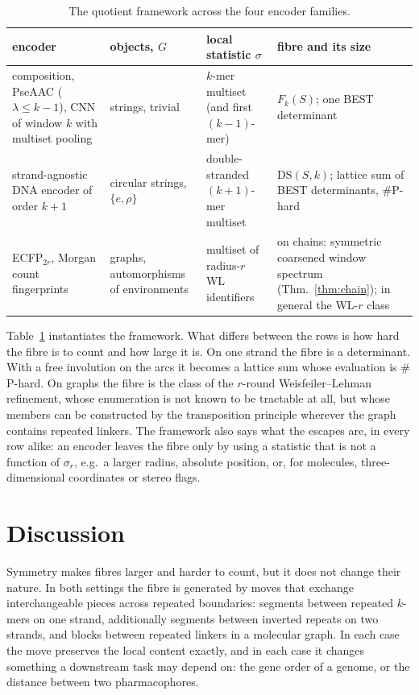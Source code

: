 \documentclass[11pt]{article}
\theoremstyle{plain}
\theoremstyle{definition}
\theoremstyle{remark}
\newcommand{\DS}{\mathrm{DS}}
\begin{document}
\begin{table}[t]
\centering\small
\renewcommand{\arraystretch}{1.15}
\begin{tabular}{>{\raggedright\arraybackslash}p{}>{\raggedright\arraybackslash}p{}>{\raggedright\arraybackslash}p{}>{\raggedright\arraybackslash}p{}}
\toprule
encoder & objects, $G$ & local statistic $\sigma$ & fibre and its size\\
\midrule
composition, PseAAC ($\lambda\le k-1$), CNN of window $k$ with multiset pooling & strings, trivial & $k$-mer multiset (and first $(k-1)$-mer) & $F_k(S)$; one BEST determinant \cite{CC26a}\\
strand-agnostic DNA encoder of order $k+1$ & circular strings, $\{e,\rho\}$ & double-stranded $(k+1)$-mer multiset & $\DS(S,k)$; lattice sum of BEST determinants, $\#$P-hard \cite{AG}\\
ECFP$_{2r}$, Morgan count fingerprints & graphs, automorphisms of environments & multiset of radius-$r$ WL identifiers & on chains: symmetric coarsened window spectrum (Thm.~\ref{thm:chain}); in general the WL-$r$ class\\
\bottomrule
\end{tabular}
\caption{The quotient framework across the four encoder families.}\label{tab:unified}
\end{table}

Table~\ref{tab:unified} instantiates the framework. What differs between the rows is how hard the fibre is to
count and how large it is. On one strand the fibre is a determinant. With a free involution on the arcs it
becomes a lattice sum whose evaluation is $\#$P-hard. On graphs the fibre is the class of the $r$-round
Weisfeiler--Lehman refinement, whose enumeration is not known to be tractable at all, but whose members can be
constructed by the transposition principle wherever the graph contains repeated linkers. The framework also
says what the escapes are, in every row alike: an encoder leaves the fibre only by using a statistic that is not
a function of $\sigma_r$, e.g.\ a larger radius, absolute position, or, for molecules, three-dimensional
coordinates or stereo flags.

\section{Discussion}\label{sec:discussion}

Symmetry makes fibres larger and harder to count, but it does not change their nature. In both settings the
fibre is generated by moves that exchange interchangeable pieces across repeated boundaries: segments between
repeated $k$-mers on one strand, additionally segments between inverted repeats on two strands, and blocks
between repeated linkers in a molecular graph. In each case the move preserves the local content exactly, and in
each case it changes something a downstream task may depend on: the gene order of a genome, or the distance
between two pharmacophores.
\end{document}

